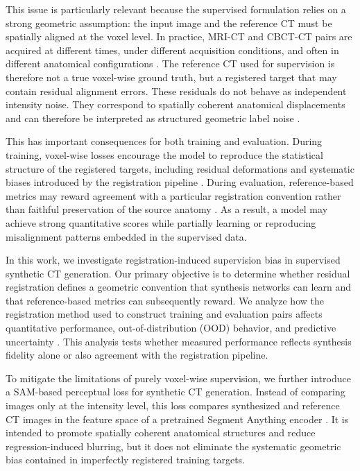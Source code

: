 \documentclass[lettersize,journal]{IEEEtran}
\begin{document}
This issue is particularly relevant because the supervised formulation relies on a strong geometric assumption: the input image and the reference CT must be spatially aligned at the voxel level. In practice, MRI-CT and CBCT-CT pairs are acquired at different times, under different acquisition conditions, and often in different anatomical configurations \cite{edmund2017review,nyholm2018mr}. The reference CT used for supervision is therefore not a true voxel-wise ground truth, but a registered target that may contain residual alignment errors. These residuals do not behave as independent intensity noise. They correspond to spatially coherent anatomical displacements and can therefore be interpreted as structured geometric label noise \cite{florkow2019impact,kong2021breaking,dayarathna2024deep}.

This has important consequences for both training and evaluation. During training, voxel-wise losses encourage the model to reproduce the statistical structure of the registered targets, including residual deformations and systematic biases introduced by the registration pipeline \cite{zhou2023mitigating,li2025boosting,lee2025meta}. During evaluation, reference-based metrics may reward agreement with a particular registration convention rather than faithful preservation of the source anatomy \cite{dohmen2024similarity}. As a result, a model may achieve strong quantitative scores while partially learning or reproducing misalignment patterns embedded in the supervised data.

In this work, we investigate registration-induced supervision bias in supervised synthetic CT generation. Our primary objective is to determine whether residual registration defines a geometric convention that synthesis networks can learn and that reference-based metrics can subsequently reward. We analyze how the registration method used to construct training and evaluation pairs affects quantitative performance, out-of-distribution (OOD) behavior, and predictive uncertainty \cite{hemon2026towards}. This analysis tests whether measured performance reflects synthesis fidelity alone or also agreement with the registration pipeline.

To mitigate the limitations of purely voxel-wise supervision, we further introduce a SAM-based perceptual loss for synthetic CT generation. Instead of comparing images only at the intensity level, this loss compares synthesized and reference CT images in the feature space of a pretrained Segment Anything encoder \cite{kirillov2023segment}. It is intended to promote spatially coherent anatomical structures and reduce regression-induced blurring, but it does not eliminate the systematic geometric bias contained in imperfectly registered training targets.
\end{document}
